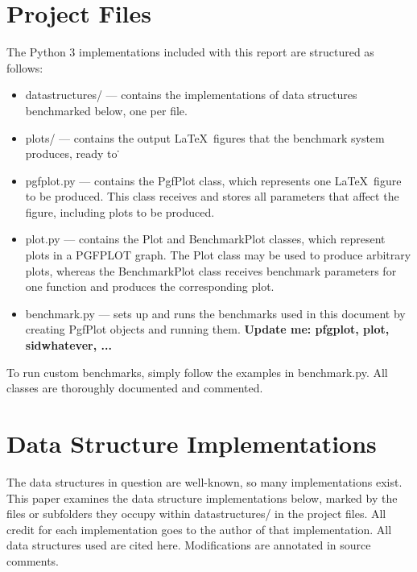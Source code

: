 \documentclass{article}
\newcommand {\todo}[1] {{\textbf{\color{red}#1}}}
\begin{document}
\section{Project Files}
The Python 3 implementations included with this report are structured as follows:
\begin{itemize}
    \item datastructures/ --- contains the implementations of data structures benchmarked below, one per file.
    \item plots/ --- contains the output \LaTeX \ figures that the benchmark system produces, ready to \.
    \item pgfplot.py --- contains the PgfPlot class, which represents one \LaTeX \ figure to be produced. This class receives and stores all parameters that affect the figure, including plots to be produced.
    \item plot.py --- contains the Plot and BenchmarkPlot classes, which represent plots in a PGFPLOT graph. The Plot class may be used to produce arbitrary plots, whereas the BenchmarkPlot class receives benchmark parameters for one function and produces the corresponding plot.
    \item benchmark.py --- sets up and runs the benchmarks used in this document by creating PgfPlot objects and running them.
    \todo{Update me: pfgplot, plot, sidwhatever, ...}
\end{itemize}

To run custom benchmarks, simply follow the examples in benchmark.py. All classes are thoroughly documented and commented.

\section{Data Structure Implementations}
The data structures in question are well-known, so many implementations exist. This paper examines the data structure implementations below, marked by the files or subfolders they occupy within datastructures/ in the project files. All credit for each implementation goes to the author of that implementation. All data structures used are cited here. Modifications are annotated in source comments.
\end{document}

